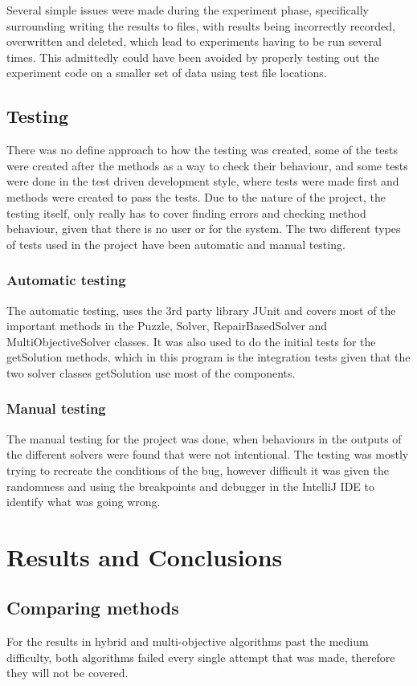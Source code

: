 \documentclass[a4paper,11pt]{article}
\begin{document}
Several simple issues were made during the experiment phase, specifically surrounding writing the results to files, with results being incorrectly recorded, overwritten and deleted, which lead to experiments having to be run several times. This admittedly could have been avoided by properly testing out the experiment code on a smaller set of data using test file locations.
\subsection{Testing }
There was no define approach to how the testing was created, some of the tests were created after the methods as a way to check their behaviour, and some tests were done in the test driven development style, where tests were made first and methods were created to pass the tests. Due to the nature of the project, the testing itself, only really has to cover finding errors and checking method behaviour, given that there is no user or for the system. The two different types of tests used in the project have been automatic and manual testing.
\subsubsection{Automatic testing}
The automatic testing, uses the 3rd party library JUnit and covers most of the important methods in the Puzzle, Solver, RepairBasedSolver and MultiObjectiveSolver classes. It was also used to do the initial tests for the getSolution methods, which in this program is the integration tests given that the two solver classes getSolution use most of the components.  
\subsubsection{Manual testing}
The manual testing for the project was done, when behaviours in the outputs of the different solvers were found that were not intentional. The testing was mostly trying to recreate the conditions of the bug, however difficult it was given the randomness and using the breakpoints and debugger in the IntelliJ IDE to identify what was going wrong.

\section{Results and Conclusions}

\subsection{Comparing methods}
For the results in hybrid and multi-objective algorithms past the medium difficulty, both algorithms failed every single attempt that was made, therefore they will not be covered.
\end{document}
